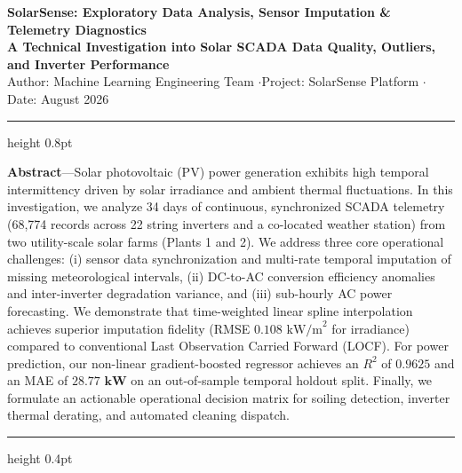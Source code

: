 \documentclass[10pt,a4paper]{article}
\begin{document}

\begin{center}
    {\LARGE\textbf{SolarSense: Exploratory Data Analysis, Sensor Imputation \& Telemetry Diagnostics}}\\[4pt]
    {\normalsize\textbf{A Technical Investigation into Solar SCADA Data Quality, Outliers, and Inverter Performance}}\\[3pt]
    \footnotesize Author: Machine Learning Engineering Team \quad$\cdot$\quad Project: SolarSense Platform \quad$\cdot$\quad Date: August 2026
\end{center}

\vspace{-4pt}
\hrule height 0.8pt
\vspace{6pt}

\noindent\textbf{Abstract}---Solar photovoltaic (PV) power generation exhibits high temporal intermittency driven by solar irradiance and ambient thermal fluctuations. In this investigation, we analyze 34 days of continuous, synchronized SCADA telemetry (68,774 records across 22 string inverters and a co-located weather station) from two utility-scale solar farms (Plants 1 and 2). We address three core operational challenges: (i) sensor data synchronization and multi-rate temporal imputation of missing meteorological intervals, (ii) DC-to-AC conversion efficiency anomalies and inter-inverter degradation variance, and (iii) sub-hourly AC power forecasting. We demonstrate that time-weighted linear spline interpolation achieves superior imputation fidelity (RMSE $0.108\text{ kW/m}^2$ for irradiance) compared to conventional Last Observation Carried Forward (LOCF). For power prediction, our non-linear gradient-boosted regressor achieves an $R^2$ of $\mathbf{0.9625}$ and an MAE of $\mathbf{28.77\text{ kW}}$ on an out-of-sample temporal holdout split. Finally, we formulate an actionable operational decision matrix for soiling detection, inverter thermal derating, and automated cleaning dispatch.

\vspace{4pt}
\hrule height 0.4pt
\vspace{6pt}
\end{document}
